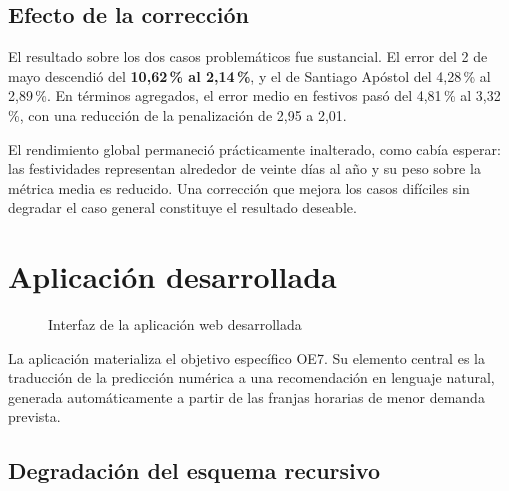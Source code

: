 \subsection*{Efecto de la corrección}

El resultado sobre los dos casos problemáticos fue sustancial. El error del 2 de
mayo descendió del \textbf{10,62\,\% al 2,14\,\%}, y el de Santiago Apóstol del
4,28\,\% al 2,89\,\%. En términos agregados, el error medio en festivos pasó del
4,81\,\% al 3,32\,\%, con una reducción de la penalización de 2,95 a 2,01.

El rendimiento global permaneció prácticamente inalterado, como cabía esperar: las
festividades representan alrededor de veinte días al año y su peso sobre la
métrica media es reducido. Una corrección que mejora los casos difíciles sin
degradar el caso general constituye el resultado deseable.



\section{Aplicación desarrollada}


\begin{figure}[H]
\centering
\caption{Interfaz de la aplicación web desarrollada}
\label{fig:app}
\end{figure}

La aplicación materializa el objetivo específico OE7. Su elemento central es la
traducción de la predicción numérica a una recomendación en lenguaje natural,
generada automáticamente a partir de las franjas horarias de menor demanda
prevista.

\subsection*{Degradación del esquema recursivo}


